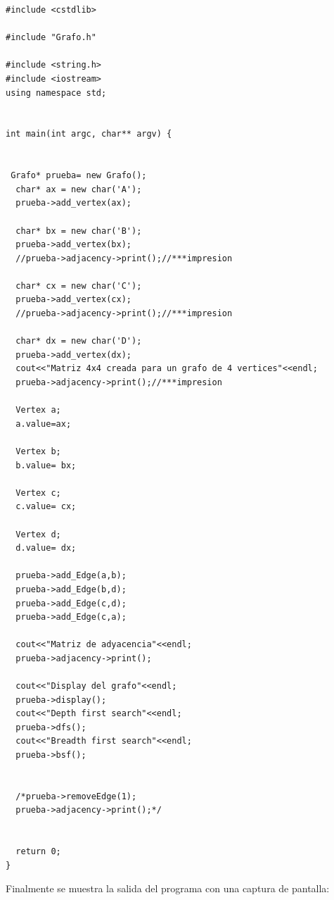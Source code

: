 \documentclass[11pt]{article}
\begin{document}
\lstset {language=C}
\begin{lstlisting}
#include <cstdlib>

#include "Grafo.h"

#include <string.h>
#include <iostream>
using namespace std;


int main(int argc, char** argv) {
   
    
 Grafo* prueba= new Grafo();
  char* ax = new char('A');
  prueba->add_vertex(ax);

  char* bx = new char('B');
  prueba->add_vertex(bx);
  //prueba->adjacency->print();//***impresion

  char* cx = new char('C');
  prueba->add_vertex(cx);
  //prueba->adjacency->print();//***impresion

  char* dx = new char('D');
  prueba->add_vertex(dx);
  cout<<"Matriz 4x4 creada para un grafo de 4 vertices"<<endl;
  prueba->adjacency->print();//***impresion

  Vertex a;
  a.value=ax;

  Vertex b;
  b.value= bx;

  Vertex c;
  c.value= cx;
  
  Vertex d;
  d.value= dx;  

  prueba->add_Edge(a,b);
  prueba->add_Edge(b,d);  
  prueba->add_Edge(c,d);
  prueba->add_Edge(c,a);
  
  cout<<"Matriz de adyacencia"<<endl;  
  prueba->adjacency->print();
  
  cout<<"Display del grafo"<<endl;
  prueba->display();
  cout<<"Depth first search"<<endl;  
  prueba->dfs();
  cout<<"Breadth first search"<<endl;  
  prueba->bsf();


  /*prueba->removeEdge(1);
  prueba->adjacency->print();*/
    
    
  return 0;
}
\end{lstlisting}
Finalmente se muestra la salida del programa con una captura de pantalla:
\end{document}

